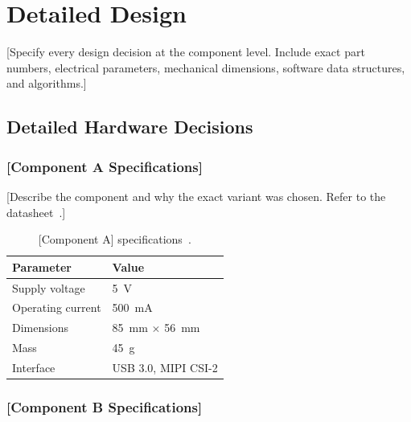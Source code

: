 \chapter{Detailed Design}
\label{ch:detailed}

[Specify every design decision at the component level. Include
exact part numbers, electrical parameters, mechanical dimensions,
software data structures, and algorithms.]

\section{Detailed Hardware Decisions}
\label{sec:detailed-hw}

\subsection{[Component A Specifications]}
\label{subsec:comp-a}

[Describe the component and why the exact variant was chosen.
Refer to the datasheet~\cite{example_datasheet}.]

\begin{table}[H]
    \centering
    \caption{[Component A] specifications~\cite{example_datasheet}.}
    \label{tab:comp-a-specs}
    \begin{tabular}{@{} l l @{}}
        \toprule
        \textbf{Parameter}       & \textbf{Value} \\
        \midrule
        Supply voltage           & \SI{5}{\volt} \\
        Operating current        & \SI{500}{\milli\ampere} \\
        Dimensions               & \SI{85}{\mm} $\times$ \SI{56}{\mm} \\
        Mass                     & \SI{45}{\gram} \\
        Interface                & USB 3.0, MIPI CSI-2 \\
        \bottomrule
    \end{tabular}
\end{table}

\subsection{[Component B Specifications]}
\label{subsec:comp-b}

